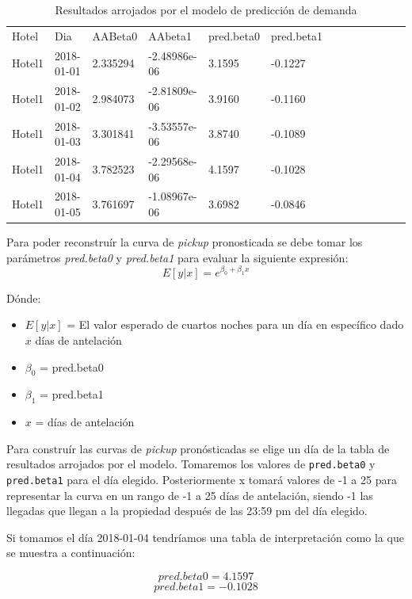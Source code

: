 \begin{table}[H]

\begin{tabular}{lllllllllllll}
Hotel  & Dia         & AABeta0  & AAbeta1      & pred.beta0 & pred.beta1  \\
Hotel1 & 2018-01-01  & 2.335294 & -2.48986e-06 & 3.1595     & -0.1227     \\
Hotel1 & 2018-01-02  & 2.984073 & -2.81809e-06 & 3.9160     & -0.1160     \\
Hotel1 & 2018-01-03  & 3.301841 & -3.53557e-06 & 3.8740     & -0.1089     \\
Hotel1 & 2018-01-04  & 3.782523 & -2.29568e-06 & 4.1597     & -0.1028     \\
Hotel1 & 2018-01-05 & 3.761697 & -1.08967e-06 & 3.6982     & -0.0846    
\end{tabular}
\caption{Resultados arrojados por el modelo de predicción de demanda} 
\end{table}

Para poder reconstruír la curva de \emph{pickup} pronosticada se debe tomar los parámetros \emph{pred.beta0} y \emph{pred.beta1} para evaluar la siguiente expresión: $$E[y|x]=e^{\beta_0 + \beta_1x}$$

Dónde:
\begin{itemize}[noitemsep]
\item $E[y|x]$ = El valor esperado de cuartos noches para un día en específico dado $x$ días de antelación
\item $\beta_0$ = pred.beta0
\item $\beta_1$ = pred.beta1
\item $x$ = días de antelación
\end{itemize}

Para construír las curvas de \emph{pickup} pronósticadas se elige un día de la tabla de resultados arrojados por el modelo. Tomaremos los valores de \texttt{pred.beta0} y \texttt{pred.beta1} para el día elegido. Posteriormente x tomará valores de -1 a 25 para representar la curva en un rango de -1 a 25 días de antelación, siendo -1 las llegadas que llegan a la propiedad después de las 23:59 pm del día elegido.

Si tomamos el día 2018-01-04 tendríamos una tabla de interpretación como la que se muestra a continuación:

$$pred.beta0 = 4.1597$$ $$pred.beta1 = -0.1028$$

